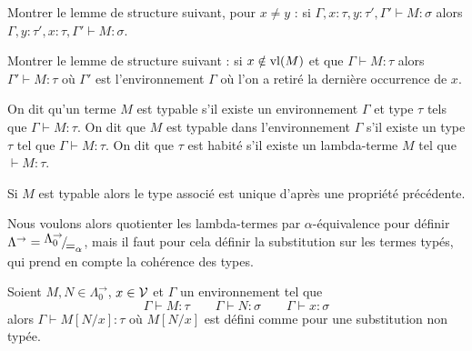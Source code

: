\begin{exo}
    Montrer le lemme de structure suivant, pour $x\neq y$ : si $\Gamma,x : \tau,y : \tau',\Gamma'\vdash M : \sigma$ alors $\Gamma,y : \tau',x : \tau,\Gamma'\vdash M : \sigma$.
\end{exo}

\begin{exo}
    Montrer le lemme de structure suivant : si $x\notin\mathrm{vl}(M)$ et que $\Gamma\vdash M : \tau$ alors $\Gamma'\vdash M : \tau$ où $\Gamma'$ est l'environnement $\Gamma$ où l'on a retiré la dernière occurrence de $x$.
\end{exo}

\begin{defi}
    On dit qu'un terme $M$ est typable s'il existe un environnement $\Gamma$ et type $\tau$ tels que $\Gamma\vdash M : \tau$. On dit que $M$ est typable dans l'environnement $\Gamma$ s'il existe un type $\tau$ tel que $\Gamma\vdash M : \tau$. On dit que $\tau$ est habité s'il existe un lambda-terme $M$ tel que $\vdash M : \tau$.
\end{defi}

\begin{rmk}
    Si $M$ est typable alors le type associé est unique d'après une propriété précédente.
\end{rmk}

Nous voulons alors quotienter les lambda-termes par $\alpha$-équivalence pour définir $\Lambda^{\to} = \quot{\Lambda_0^{\to}}{=_\alpha}$, mais il faut pour cela définir la substitution sur les termes typés, qui prend en compte la cohérence des types.

\begin{prop}
    Soient $M,N\in\Lambda_0^{\to}$, $x\in\mathcal V$ et $\Gamma$ un environnement tel que $$\Gamma\vdash M : \tau\qquad \Gamma\vdash N : \sigma\qquad \Gamma\vdash x : \sigma$$ alors $\Gamma\vdash M[N/x] : \tau$ où $M[N/x]$ est défini comme pour une substitution non typée.
\end{prop}

